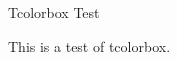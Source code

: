 \documentclass[aspectratio=169, 10pt]{beamer}
\begin{document}
\begin{frame}{Tcolorbox Test}
\begin{tcolorbox}[title=Test Box]
This is a test of tcolorbox.
\end{tcolorbox}
\end{frame}
\end{document}
